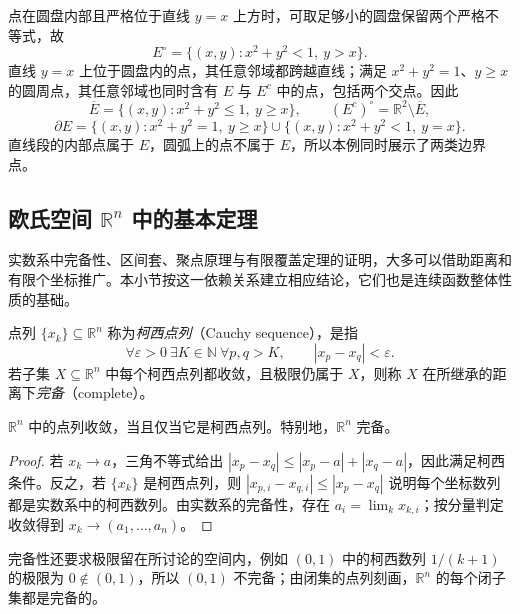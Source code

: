 \documentclass[UTF8,12pt,a4paper,fontset=fandol]{ctexbook}
\begin{document}
\begin{solve}
点在圆盘内部且严格位于直线 $y=x$ 上方时，可取足够小的圆盘保留两个严格不等式，故
\[
    E^\circ=\{(x,y):x^2+y^2<1,\ y>x\}.
\]
直线 $y=x$ 上位于圆盘内的点，其任意邻域都跨越直线；满足 $x^2+y^2=1$、$y\geq x$ 的圆周点，其任意邻域也同时含有 $E$ 与 $E^c$ 中的点，包括两个交点。因此
\[
    \overline E=\{(x,y):x^2+y^2\leq1,\ y\geq x\},\qquad
    (E^c)^\circ=\mathbb R^2\setminus\overline E,
\]
\[
    \partial E=\{(x,y):x^2+y^2=1,\ y\geq x\}
          \cup\{(x,y):x^2+y^2<1,\ y=x\}.
\]
直线段的内部点属于 $E$，圆弧上的点不属于 $E$，所以本例同时展示了两类边界点。
\end{solve}

\subsection{欧氏空间 \texorpdfstring{$\mathbb{R}^n$}{R^n} 中的基本定理}
\label{subsec:fundamental-theorems-of-euclidean-space}

实数系中完备性、区间套、聚点原理与有限覆盖定理的证明，大多可以借助距离和有限个坐标推广。本小节按这一依赖关系建立相应结论，它们也是连续函数整体性质的基础。

\begin{definition}
\label{def:euclidean-cauchy-sequence-completeness}
点列 $\{x_k\}\subseteq\mathbb R^n$ 称为\emph{柯西点列}（Cauchy sequence），是指
\[
    \forall\varepsilon>0\ \exists K\in\mathbb N\ \forall p,q>K,
    \qquad |x_p-x_q|<\varepsilon.
\]
若子集 $X\subseteq\mathbb R^n$ 中每个柯西点列都收敛，且极限仍属于 $X$，则称 $X$ 在所继承的距离下\emph{完备}（complete）。
\end{definition}

\begin{theorem}[欧氏空间的完备性]
\label{thm:euclidean-completeness}
$\mathbb R^n$ 中的点列收敛，当且仅当它是柯西点列。特别地，$\mathbb R^n$ 完备。
\end{theorem}

\begin{proof}
若 $x_k\to a$，三角不等式给出 $|x_p-x_q|\leq|x_p-a|+|x_q-a|$，因此满足柯西条件。反之，若 $\{x_k\}$ 是柯西点列，则 $|x_{p,i}-x_{q,i}|\leq|x_p-x_q|$ 说明每个坐标数列都是实数系中的柯西数列。由实数系的完备性，存在 $a_i=\lim_kx_{k,i}$；按分量判定收敛得到 $x_k\to(a_1,\ldots,a_n)$。
\end{proof}

完备性还要求极限留在所讨论的空间内，例如 $(0,1)$ 中的柯西数列 $1/(k+1)$ 的极限为 $0\notin(0,1)$，所以 $(0,1)$ 不完备；由闭集的点列刻画，$\mathbb R^n$ 的每个闭子集都是完备的。
\end{document}

